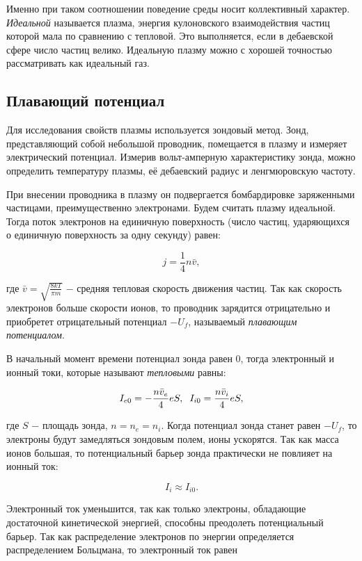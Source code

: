 \documentclass[a4paper,12pt]{article} %
\begin{document}
\hfill \break Именно при таком соотношении поведение среды носит коллективный характер. \textit{Идеальной} называется плазма, энергия кулоновского взаимодействия частиц которой мала по сравнению с тепловой. Это выполняется, если в дебаевской сфере число частиц велико. Идеальную плазму можно с хорошей точностью рассматривать как идеальный газ.

\subsection{Плавающий потенциал}

\hfill \break Для исследования свойств плазмы используется зондовый метод. Зонд, представляющий собой небольшой проводник, помещается в плазму и измеряет электрический потенциал. Измерив вольт-амперную характеристику зонда, можно определить температуру плазмы, её дебаевский радиус и ленгмюровскую частоту.
    
\hfill \break При внесении проводника в плазму он подвергается бомбардировке заряженными частицами, преимущественно электронами. Будем считать плазму идеальной. Тогда поток электронов на единичную поверхность (число частиц, ударяющихся о единичную поверхность за одну секунду) равен:

$$
j = \frac{1}{4} n \bar v,
$$

\hfill \break где $\bar v = \sqrt{\frac{8 k T}{\pi m}}$ $-$ средняя тепловая скорость движения частиц. Так как скорость электронов больше скорости ионов, то проводник зарядится отрицательно и приобретет отрицательный потенциал $-U_f$, называемый \textit{плавающим потенциалом}.
    
\hfill \break В начальный момент времени потенциал зонда равен $0$, тогда электронный и ионный токи, которые называют \textit{тепловыми} равны:

$$
I_{e0} = -\frac{n \bar v_e}{4} eS, \hspace{2mm} I_{i0} = \frac{n \bar v_i}{4} eS,
$$
    
\hfill \break где $S$ $-$ площадь зонда, $n = n_{e} = n_{i}$. Когда потенциал зонда станет равен $-U_f$, то электроны будут замедляться зондовым полем, ионы ускорятся. Так как масса ионов большая, то потенциальный барьер зонда практически не повлияет на ионный ток:
    
$$
I_i \approx I_{i0}.
$$
    
\hfill \break Электронный ток уменьшится, так как только электроны, обладающие достаточной кинетической энергией, способны преодолеть потенциальный барьер. Так как распределение электронов по энергии определяется распределением Больцмана, то электронный ток равен
    
\end{document}
